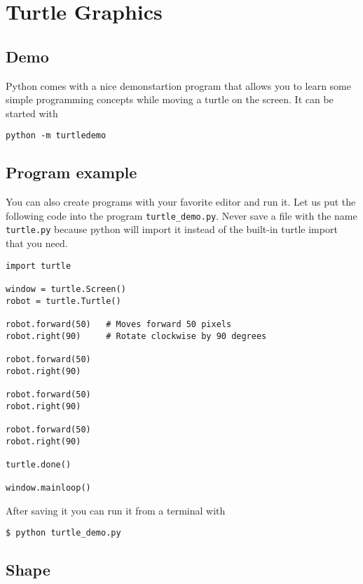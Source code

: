 

\chapter{Turtle Graphics}\label{turtle-graphics}
\FILENAME

\section{Demo}\label{demo}

Python comes with a nice demonstartion program that allows you to learn
some simple programming concepts while moving a turtle on the screen. It
can be started with

\begin{verbatim}
python -m turtledemo
\end{verbatim}

\section{Program example}\label{program-example}

You can also create programs with your favorite editor and run it. Let
us put the following code into the program \texttt{turtle\_demo.py}.
Never save a file with the name \texttt{turtle.py} because python will
import it instead of the built-in turtle import that you need.

\begin{verbatim}
import turtle

window = turtle.Screen() 
robot = turtle.Turtle() 

robot.forward(50)   # Moves forward 50 pixels
robot.right(90)     # Rotate clockwise by 90 degrees

robot.forward(50)
robot.right(90)

robot.forward(50)
robot.right(90)

robot.forward(50)
robot.right(90)

turtle.done()

window.mainloop()
\end{verbatim}

After saving it you can run it from a terminal with

\begin{verbatim}
$ python turtle_demo.py
\end{verbatim}

\section{Shape}\label{shape}

